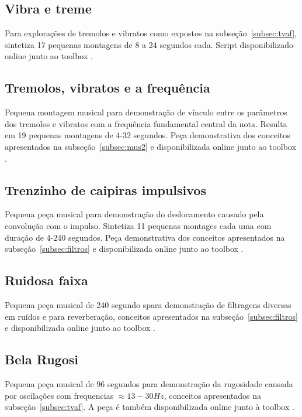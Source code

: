 \clearpage
\subsection{Vibra e treme}\label{ap:vibra}
Para explorações de tremolos e vibratos como expostos na subseção~\ref{subsec:tvaf}, sintetiza 17 pequenas montagens de 8 a 24 segundos cada. Script disponibilizado online junto ao toolbox \massa.\cite{MASSA}



\subsection{Tremolos, vibratos e a frequência}\label{ap:tremolos}
Pequena montagem musical para demonstração de vínculo entre os parâmetros dos tremolos e vibratos com a frequência fundamental central da nota. Resulta em 19 pequenas montagens de 4-32 segundos. Peça demonstrativa dos conceitos apresentados na subseção~\ref{subsec:mus2} e disponibilizada online junto ao toolbox \massa.\cite{MASSA}



\subsection{Trenzinho de caipiras impulsivos}\label{ap:trenzinho}
Pequena peça musical para demonstração do deslocamento causado pela convolução com o impulso. Sintetiza 11 pequenas montages cada uma com duração de 4-240 segundos. Peça demonstrativa dos conceitos apresentados na subseção~\ref{subsec:filtros} e disponibilizada online junto ao toolbox \massa.



\subsection{Ruidosa faixa}\label{ap:ruidosa}
Pequena peça musical de 240 segundo spara demonstração de filtragens diversas em ruídos e para reverberação, conceitos apresentados na subseção~\ref{subsec:filtros} e disponibilizada online junto ao toolbox \massa.\cite{MASSA}

\clearpage


\subsection{Bela Rugosi}\label{ap:bela}
Pequena peça musical de 96 segundos para demonstração da rugosidade causada por oscilações com frequencias $\approx 13-30 Hz$, conceitos apresentados na subseção~\ref{subsec:tvaf}. A peça é também disponibilizada online junto à toolbox \massa.\cite{MASSA}

